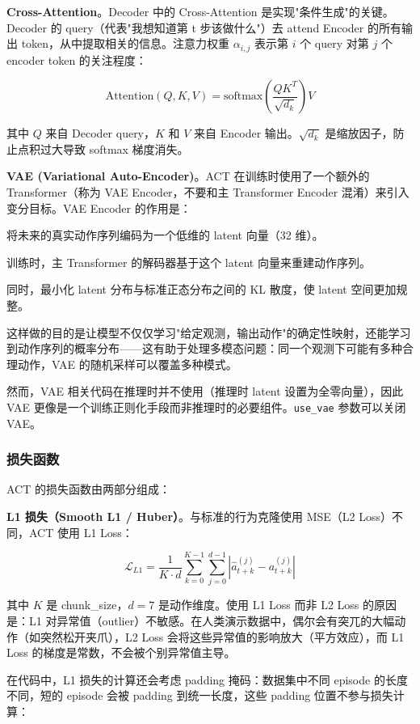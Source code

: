 \documentclass[UTF8,a4paper,11pt]{ctexart}
\begin{document}
{\textbf{Cross-Attention}。Decoder 中的 Cross-Attention 是实现"条件生成"的关键。Decoder 的 query（代表"我想知道第 t 步该做什么"）去 attend Encoder 的所有输出 token，从中提取相关的信息。注意力权重 $\alpha_{i,j}$ 表示第 $i$ 个 query 对第 $j$ 个 encoder token 的关注程度：

$$\text{Attention}(Q, K, V) = \text{softmax}\left(\frac{QK^T}{\sqrt{d_k}}\right)V$$

其中 $Q$ 来自 Decoder query，$K$ 和 $V$ 来自 Encoder 输出。$\sqrt{d_k}$ 是缩放因子，防止点积过大导致 softmax 梯度消失。

\textbf{VAE (Variational Auto-Encoder)}。ACT 在训练时使用了一个额外的 Transformer（称为 VAE Encoder，不要和主 Transformer Encoder 混淆）来引入变分目标。VAE Encoder 的作用是：

\item[1] 将未来的真实动作序列编码为一个低维的 latent 向量（32 维）。
\item[2] 训练时，主 Transformer 的解码器基于这个 latent 向量来重建动作序列。
\item[3] 同时，最小化 latent 分布与标准正态分布之间的 KL 散度，使 latent 空间更加规整。

这样做的目的是让模型不仅仅学习"给定观测，输出动作"的确定性映射，还能学习到动作序列的概率分布——这有助于处理多模态问题：同一个观测下可能有多种合理动作，VAE 的随机采样可以覆盖多种模式。

然而，VAE 相关代码在推理时并不使用（推理时 latent 设置为全零向量），因此 VAE 更像是一个训练正则化手段而非推理时的必要组件。\texttt{use_vae} 参数可以关闭 VAE。

\subsubsection{损失函数}

ACT 的损失函数由两部分组成：

\textbf{L1 损失（Smooth L1 / Huber）}。与标准的行为克隆使用 MSE（L2 Loss）不同，ACT 使用 L1 Loss：

$$\mathcal{L}_{L1} = \frac{1}{K \cdot d} \sum_{k=0}^{K-1} \sum_{j=0}^{d-1} |\hat{a}_{t+k}^{(j)} - a_{t+k}^{(j)}|$$

其中 $K$ 是 chunk_size，$d=7$ 是动作维度。使用 L1 Loss 而非 L2 Loss 的原因是：L1 对异常值（outlier）不敏感。在人类演示数据中，偶尔会有突兀的大幅动作（如突然松开夹爪），L2 Loss 会将这些异常值的影响放大（平方效应），而 L1 Loss 的梯度是常数，不会被个别异常值主导。

在代码中，L1 损失的计算还会考虑 padding 掩码：数据集中不同 episode 的长度不同，短的 episode 会被 padding 到统一长度，这些 padding 位置不参与损失计算：

}
\end{document}
